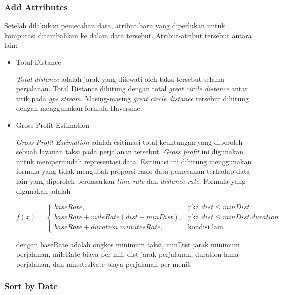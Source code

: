 \documentclass{article}
\begin{document}
\subsubsection{Add Attributes}

\begin{adjustwidth}{4em}{0pt}
	
	\hspace{\parindent}Setelah dilakukan pemecahan data, atribut baru yang diperlukan untuk komputasi ditambahkan ke dalam data tersebut. Atribut-atribut tersebut antara lain:
	
	\begin{itemize}
		\item{Total Distance}
		
		\textit{Total distance} adalah jarak yang dilewati oleh taksi tersebut selama perjalanan. Total Distance dihitung dengan total \textit{great circle distance} antar titik pada \textit{gps stream}. Masing-masing \textit{great circle distance} tersebut dihitung dengan menggunakan formula Haversine.
		
		\item{Gross Profit Estimation}
		
		\textit{Gross Profit Estimation} adalah esitimasi  total keuntungan  yang diperoleh sebuah layanan taksi pada perjalanan tersebut. \textit{Gross profit} ini digunakan untuk mempermudah representasi data. Esitimasi ini dihitung menggunakan formula yang tidak mengubah proporsi rasio data pemesanan terhadap data lain yang diperoleh berdasarkan \textit{time-rate} dan \textit{distance-rate}. Formula yang digunakan adalah
		
		\[
		f(x) = 
		\begin{cases}
		baseRate,& \text{jika } dist \leq minDist \\
		baseRate+mileRate(dist-minDist),& \text{jika } dist \le minDist.duration \\
		baseRate+duration.minutesRate, & \text{kondisi lain}
		\end{cases}
		\]
		
		dengan baseRate adalah ongkos minimum taksi, minDist jarak minimum perjalanan, mileRate biaya per mil, dist jarak perjalanan, duration lama perjalanan, dan minutesRate biaya perjalanan per menit.
		
	\end{itemize}
	
	
\end{adjustwidth}

\subsubsection{Sort by Date}
\end{document}
